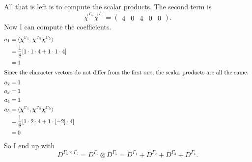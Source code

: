 \documentclass[11pt, english, fleqn, DIV=15, headinclude, BCOR=1cm]{scrartcl}
\begin{document}
All that is left is to compute the scalar products. The second term is
\[
    \vec\chi^{\Gamma_5} \vec\chi^{\Gamma_5} =
    \begin{pmatrix}
        4 & 0 & 4 & 0 & 0
    \end{pmatrix}.
\]
Now I can compute the coefficients.
\begin{align*}
    a_1
    &= \bracket{\vec\chi^{\Gamma_1}, \vec\chi^{\Gamma_5} \vec\chi^{\Gamma_5}} \\
    &= \frac{1}{8}[1 \cdot 1 \cdot 4 + 1 \cdot 1 \cdot 4] \\
    &= 1 \\
    \intertext{%
        Since the character vectors do not differ from the first one, the
        scalar products are all the same.
    }
    a_2 &= 1 \\
    a_3 &= 1 \\
    a_4 &= 1 \\
    a_5
    &= \bracket{\vec\chi^{\Gamma_1}, \vec\chi^{\Gamma_5} \vec\chi^{\Gamma_5}} \\
    &= \frac{1}{8}[1 \cdot 2 \cdot 4 + 1 \cdot [-2] \cdot 4] \\
    &= 0
\end{align*}
So I end up with
\[
    D^{\Gamma_5 \times \Gamma_5}
    = D^{\Gamma_5} \otimes D^{\Gamma_5}
    = D^{\Gamma_1} + D^{\Gamma_2} + D^{\Gamma_3} + D^{\Gamma_4}.
\]
\end{document}
